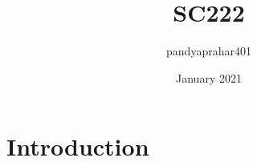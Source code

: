 \documentclass{article}
\title{SC222}
\author{pandyaprahar401 }
\date{January 2021}
\begin{document}
\maketitle

\section{Introduction}
\end{document}
